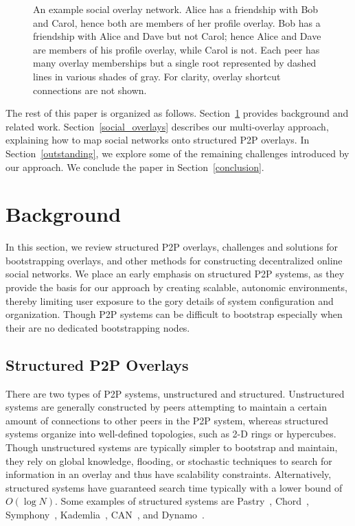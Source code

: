 \documentclass[conference]{IEEEtran}
\begin{document}
\begin{figure}[h]
\centering
{}
\caption{An example social overlay network.  Alice has a friendship with Bob
and Carol, hence both are members of her profile overlay. Bob has a friendship
with Alice and Dave but not Carol; hence Alice and Dave are members of his
profile overlay, while Carol is not.  Each peer has many overlay memberships
but a single root represented by dashed lines in various shades of gray.  For
clarity, overlay shortcut connections are not shown.} \label{fig:system}
\end{figure}

The rest of this paper is organized as follows.  Section~\ref{background}
provides background and related work.  Section~\ref{social_overlays} describes
our multi-overlay approach, explaining how to map social networks onto
structured P2P overlays.  In Section~\ref{outstanding}, we explore some of the
remaining challenges introduced by our approach.  We conclude the paper in
Section~\ref{conclusion}.

\section{Background}
\label{background}

In this section, we review structured P2P overlays, challenges and solutions
for bootstrapping overlays, and other methods for constructing decentralized
online social networks.  We place an early emphasis on structured P2P systems,
as they  provide the basis for our approach by  creating scalable, autonomic
environments, thereby limiting user exposure to the gory details of system
configuration and organization.  Though P2P systems can be difficult to
bootstrap especially when their are no dedicated bootstrapping nodes.

\subsection{Structured P2P Overlays}

There are two types of P2P systems, unstructured and structured.  Unstructured
systems are generally constructed by peers attempting to maintain a certain
amount of connections to other peers in the P2P system, whereas structured
systems organize into well-defined topologies, such as 2-D rings or
hypercubes.  Though unstructured systems are typically simpler to bootstrap
and maintain, they rely on global knowledge, flooding, or stochastic
techniques to search for information in an overlay and thus have scalability
constraints.  Alternatively, structured systems have guaranteed search time
typically with a lower bound of $O(\log N)$.  Some examples of structured
systems are Pastry~\cite{pastry}, Chord~\cite{chord},
Symphony~\cite{symphony}, Kademlia~\cite{kademlia}, CAN~\cite{can}, and
Dynamo~\cite{dynamo}.
\end{document}
